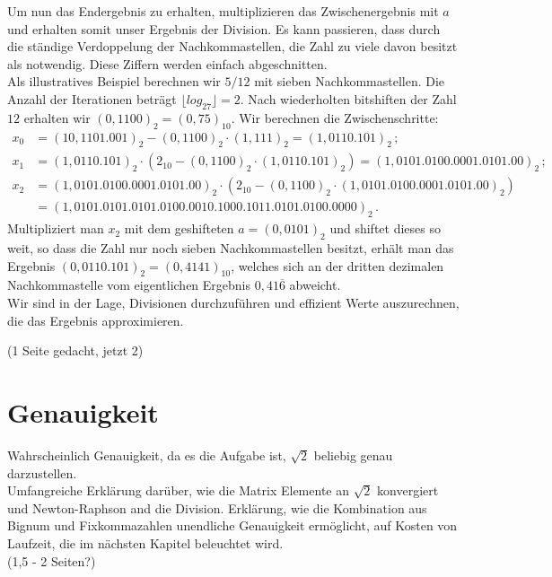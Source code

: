 \documentclass[course=erap]{aspdoc}
\begin{document}
Um nun das Endergebnis zu erhalten, multiplizieren das Zwischenergebnis mit $a$ und erhalten somit unser Ergebnis der Division.
Es kann passieren, dass durch die ständige Verdoppelung der Nachkommastellen, die Zahl zu viele davon besitzt als notwendig. Diese Ziffern werden einfach abgeschnitten. \\
Als illustratives Beispiel berechnen wir $5 / 12$ mit sieben Nachkommastellen. Die Anzahl der Iterationen beträgt $ \lfloor log_27\rfloor = 2$.
Nach wiederholten bitshiften der Zahl $12$ erhalten wir $(0,1100)_2 = (0,75)_{10}$. Wir berechnen die Zwischenschritte:
\begin{align}
  x_0 &= (10,1101.001)_2 - (0,1100)_2 \cdot (1,111)_2 = (1,0110.101)_2 \,; \label{eq:beispiel_x0} \nonumber \\ 
  x_1 &= (1,0110.101)_2 \cdot (2_{10} - (0,1100)_2 \cdot (1,0110.101)_2) = (1,0101.0100.0001.0101.00)_2  \,; \label{eq:beispiel_x1} \nonumber \\
  x_2 &= (1,0101.0100.0001.0101.00)_2 \cdot (2_{10} - (0,1100)_2 \cdot (1,0101.0100.0001.0101.00)_2) \nonumber \\ 
      &= (1,0101.0101.0101.0100.0010.1000.1011.0101.0100.0000)_2 \,. \label{eq:beispiel_x2} \nonumber
\end{align}
Multipliziert man $x_2$ mit dem geshifteten $a = (0,0101)_2$ und shiftet dieses so weit, so dass die Zahl nur noch sieben Nachkommastellen besitzt, erhält man das
Ergebnis $(0,0110.101)_2 = (0,4141)_{10}$, welches sich an der dritten dezimalen Nachkommastelle vom eigentlichen Ergebnis $0,41\overline{6}$ abweicht. \\

Wir sind in der Lage, Divisionen durchzuführen und effizient Werte auszurechnen, die das Ergebnis approximieren.

(1 Seite gedacht, jetzt 2)

\section{Genauigkeit} \label{sec:genauigkeit}
Wahrscheinlich Genauigkeit, da es die Aufgabe ist, $\sqrt{2}$ beliebig genau darzustellen. \\

Umfangreiche Erklärung darüber, wie die Matrix Elemente an $\sqrt{2}$ konvergiert und Newton-Raphson and die Division. Erklärung, wie die Kombination aus Bignum und Fixkommazahlen unendliche Genauigkeit 
ermöglicht, auf Kosten von Laufzeit, die im nächsten Kapitel beleuchtet wird. \\ 
(1,5 - 2 Seiten?)
\end{document}

